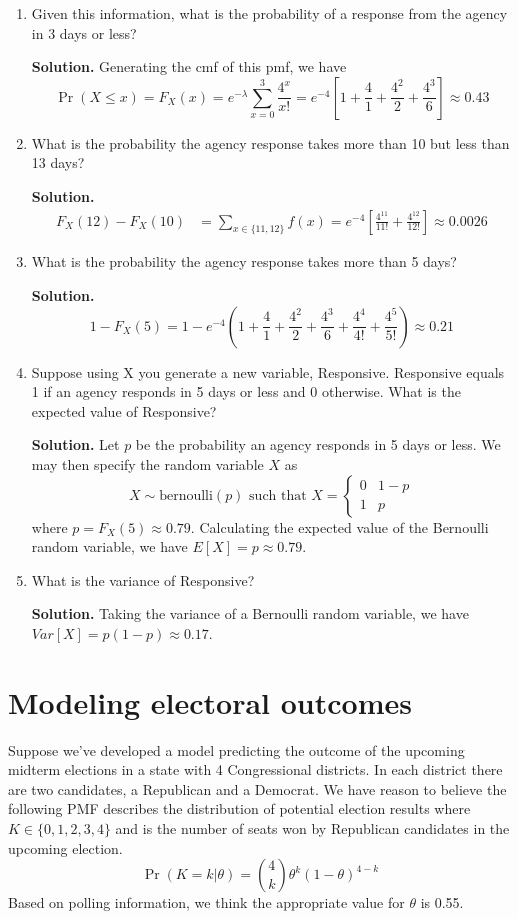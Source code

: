 \documentclass[12pt]{article}
\begin{document}
\begin{enumerate}
    \item Given this information, what is the probability of a response from the agency in 3 days or less?

    \textbf{Solution.}
    Generating the cmf of this pmf, we have
    \[ \Pr(X\leq x) = F_X(x) = e^{-\lambda} \sum_{x=0}^3 \frac{4^x}{x!} = e^{-4}\left[ 1+\frac{4}{1} +\frac{4^2}{2}+\frac{4^3}{6}\right]\approx0.43 \]
    
    \item What is the probability the agency response takes more than 10 but less than 13 days?

    \textbf{Solution.}
    \begin{align*}
        F_X(12)-F_X(10) &= \sum_{x\in\{11,12\}}f(x)= e^{-4}\left[ \frac{4^{11}}{11!}+\frac{4^{12}}{12!}\right]\approx 0.0026
    \end{align*}
    \item What is the probability the agency response takes more than 5 days?
    
    \textbf{Solution.}
    \[ 1-F_X(5) = 1-e^{-4}\left( 1+\frac{4}{1} +\frac{4^2}{2}+\frac{4^3}{6}+\frac{4^4}{4!}+\frac{4^5}{5!}\right)\approx0.21\]

    \item Suppose using X you generate a new variable, Responsive. Responsive equals 1 if an agency responds in 5 days or less and 0 otherwise. What is the expected value of Responsive?
    
    \textbf{Solution.} Let $p$ be the probability an agency responds in 5 days or less. We may then specify the random variable $X$ as 
    \[X\sim \text{bernoulli}(p) \text{ such that } X= \begin{cases}
        0 & 1-p
        \\ 1 & p
    \end{cases}\]
    where $p=F_X(5)\approx 0.79$. Calculating the expected value of the Bernoulli random variable, we have $E[X] = p \approx0.79$.
    
     \item What is the variance of Responsive?
     
     \textbf{Solution.} Taking the variance of a Bernoulli random variable, we have $Var[X] = p(1-p) \approx 0.17$.
\end{enumerate}




\section{Modeling electoral outcomes}
Suppose we’ve developed a model predicting the outcome of the upcoming midterm elections in a state with 4 Congressional districts. In each district there are two candidates, a Republican and a Democrat. We have reason to believe the following PMF describes the distribution of potential election results where $K \in \{0, 1, 2, 3, 4\}$ and is the number of seats won by Republican candidates in the upcoming election.
\[ \Pr(K=k | \theta) = \binom{4}{k}\theta^k    (1-\theta)^{4-k}\]
Based on polling information, we think the appropriate value for $\theta$ is 0.55.
\end{document}
